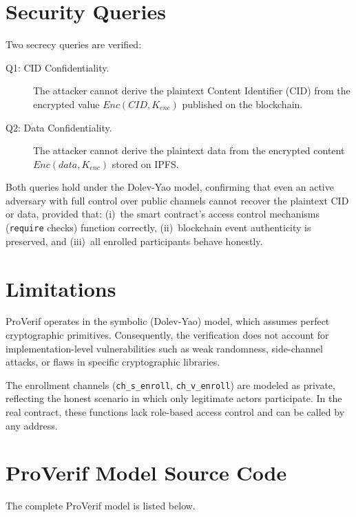 \section{Security Queries}\label{sec:appendix-b-proverif-v1-honest-queries}
Two secrecy queries are verified:
\begin{description}
    \item[Q1: CID Confidentiality.] The attacker cannot derive the plaintext Content Identifier (CID) from the encrypted value $Enc(CID, K_{enc})$ published on the blockchain.
    \item[Q2: Data Confidentiality.] The attacker cannot derive the plaintext data from the encrypted content $Enc(data, K_{enc})$ stored on IPFS.
\end{description}
Both queries hold under the Dolev-Yao model, confirming that even an active adversary with full control over public channels cannot recover the plaintext CID or data, provided that: (i)~the smart contract's access control mechanisms (\texttt{require} checks) function correctly, (ii)~blockchain event authenticity is preserved, and (iii)~all enrolled participants behave honestly.

\section{Limitations}\label{sec:appendix-b-proverif-v1-honest-limitations}
ProVerif operates in the symbolic (Dolev-Yao) model, which assumes perfect cryptographic primitives.
Consequently, the verification does not account for implementation-level vulnerabilities such as weak randomness, side-channel attacks, or flaws in specific cryptographic libraries.

The enrollment channels (\texttt{ch\_s\_enroll}, \texttt{ch\_v\_enroll}) are modeled as private, reflecting the honest scenario in which only legitimate actors participate.
In the real contract, these functions lack role-based access control and can be called by any address.
\section{ProVerif Model Source Code}\label{sec:appendix-b-proverif-source}
The complete ProVerif model is listed below.

